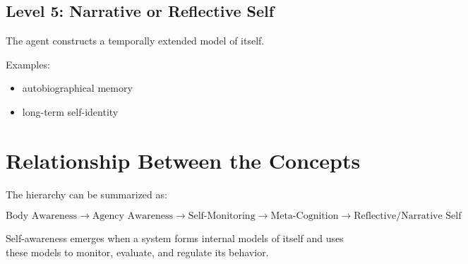 \documentclass{article}
\begin{document}
      \subsection{Level 5: Narrative or Reflective Self}

         The agent constructs a temporally extended model of itself.

         Examples:

         \begin{itemize}
            \item autobiographical memory
            \item long-term self-identity
         \end{itemize}


   \section{Relationship Between the Concepts}

      The hierarchy can be summarized as:

      \[
      \text{Body Awareness}
      \rightarrow
      \text{Agency Awareness}
      \rightarrow
      \text{Self-Monitoring}
      \rightarrow
      \text{Meta-Cognition}
      \rightarrow
      \text{Reflective/Narrative Self}
      \]

      Self-awareness emerges when a system forms internal models of itself and uses these models to monitor, evaluate, and regulate its behavior.
\end{document}
